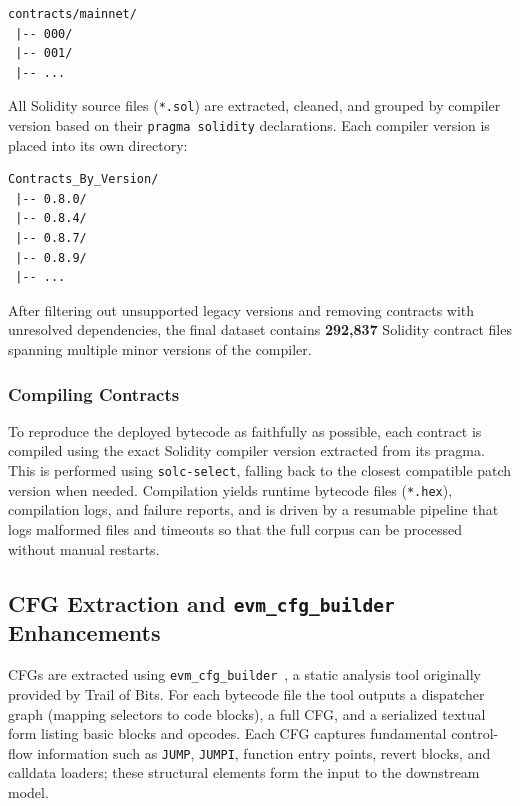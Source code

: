 \documentclass{stylefiles/capstone}
\begin{document}
\begin{verbatim}
contracts/mainnet/
 |-- 000/
 |-- 001/
 |-- ...
\end{verbatim}

All Solidity source files (\texttt{*.sol}) are extracted, cleaned, and grouped by
compiler version based on their \texttt{pragma solidity} declarations. Each
compiler version is placed into its own directory:

\begin{verbatim}
Contracts_By_Version/
 |-- 0.8.0/
 |-- 0.8.4/
 |-- 0.8.7/
 |-- 0.8.9/
 |-- ...
\end{verbatim}

After filtering out unsupported legacy versions and removing contracts with
unresolved dependencies, the final dataset contains \textbf{292{,}837} Solidity
contract files spanning multiple minor versions of the compiler.

\subsubsection{Compiling Contracts}

To reproduce the deployed bytecode as faithfully as possible, each contract is
compiled using the exact Solidity compiler version extracted from its pragma. This
is performed using \texttt{solc-select}, falling back to the closest compatible
patch version when needed. Compilation yields runtime bytecode files
(\texttt{*.hex}), compilation logs, and failure reports, and is driven by a
resumable pipeline that logs malformed files and timeouts so that the full corpus
can be processed without manual restarts.

\subsection{CFG Extraction and \texttt{evm\_cfg\_builder} Enhancements}
\label{sec:cfg-extract}

CFGs are extracted using \texttt{evm\_cfg\_builder}~\cite{evm_cfg_builder}, a
static analysis tool originally provided by Trail of Bits. For each bytecode file
the tool outputs a dispatcher graph (mapping selectors to code blocks), a full CFG,
and a serialized textual form listing basic blocks and opcodes. Each CFG captures
fundamental control-flow information such as \texttt{JUMP}, \texttt{JUMPI},
function entry points, revert blocks, and calldata loaders; these structural
elements form the input to the downstream model.
\end{document}
